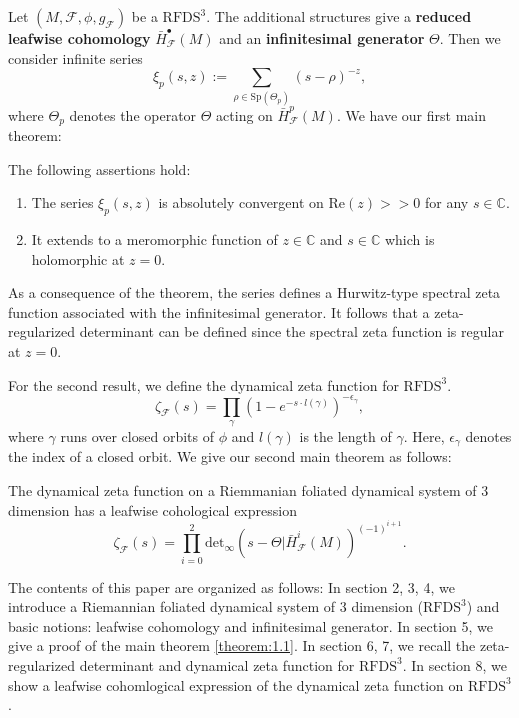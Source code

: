 Let $(M, \mathcal{F}, \phi, g_{\mathcal{F}})$ be a $\mathrm{RFDS}^3$.
The additional structures give a \textbf{reduced leafwise cohomology} $\bar{H}_{\mathcal{F}}^{\bullet}(M)$ and an \textbf{infinitesimal generator} $\Theta$.
Then we consider infinite series
\begin{equation*}
    \xi_{p}(s,z):=\sum_{\rho\in\mathrm{Sp}(\Theta_{p})}(s-\rho)^{-z},
\end{equation*}
where $\Theta_{p}$ denotes the operator $\Theta$ acting on $\bar{H}^{p}_{\mathcal{F}}(M)$.
We have our first main theorem:
\begin{theorem}\label{theorem:1.1}
The following assertions hold:
\begin{enumerate}
    \item {
        The series $\xi_{p}(s,z)$ is absolutely convergent on $\mathrm{Re}(z) >> 0$ for any $s\in\mathbb{C}$.
    }
    \item {
    It extends to a meromorphic function of $z\in\mathbb{C}$ and $s\in\mathbb{C}$} which is holomorphic at $z=0$.
\end{enumerate}
\end{theorem}
As a consequence of the theorem, the series defines a Hurwitz-type spectral zeta function associated with the infinitesimal generator.
It follows that a zeta-regularized determinant can be defined since the spectral zeta function is regular at $z=0$.

For the second result, we define the dynamical zeta function for $\mathrm{RFDS}^3$.
\begin{equation*}
    \zeta_{\mathcal{F}}(s) = \prod_{\gamma}(1-e^{-s\cdot{l(\gamma)}})^{-\epsilon_{\gamma}},
\end{equation*}
where $\gamma$ runs over closed orbits of $\phi$ and $l(\gamma)$ is the length of $\gamma$.
Here, $\epsilon_{\gamma}$ denotes the index of a closed orbit.
We give our second main theorem as follows:
\begin{theorem}\label{theorem:1.2}
The dynamical zeta function on a Riemmanian foliated dynamical system of 3 dimension has a leafwise cohological expression
\begin{equation*}
    \zeta_{\mathcal{F}}(s) = \prod_{i=0}^{2} \mathrm{det}_{\infty}(s-\Theta | \bar{H}_{\mathcal{F}}^{i}(M))^{(-1)^{i+1}}.
\end{equation*}
\end{theorem}

The contents of this paper are organized as follows:
In section 2, 3, 4, we introduce a Riemannian foliated dynamical system of 3 dimension ($\mathrm{RFDS}^3$) and basic notions: leafwise cohomology and infinitesimal generator.
In section 5, we give a proof of the main theorem \ref{theorem:1.1}.
In section 6, 7, we recall the zeta-regularized determinant and dynamical zeta function for $\mathrm{RFDS}^3$.
In section 8, we show a leafwise cohomlogical expression of the dynamical zeta function on $\mathrm{RFDS}^3$.